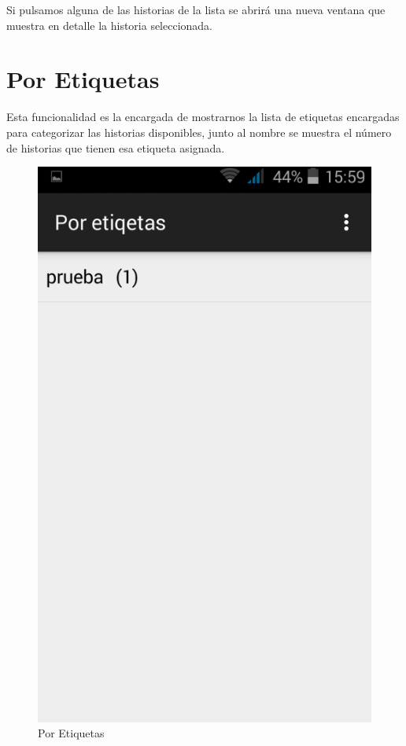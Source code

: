 \documentclass[11pt,a4paper, titlepage]{article}
\begin{document}
	Si pulsamos alguna de las historias de la lista se abrirá una nueva ventana que muestra en detalle la historia seleccionada.
	
	\FloatBarrier
	\section[Por Etiquetas]{Por Etiquetas}
	
	Esta funcionalidad es la encargada de mostrarnos la lista de etiquetas encargadas para categorizar las historias disponibles, junto al nombre se muestra el número de historias que tienen esa etiqueta asignada.
	
	\begin{figure}[hbtp]
		\centering
		\includegraphics[scale = 0.25 ]{img/6}
		\caption{Por Etiquetas}
		\label{p13}
	\end{figure}
	
\end{document}
